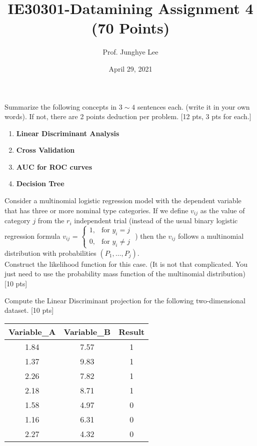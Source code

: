 \documentclass{homework}
\title{IE30301-Datamining Assignment 4 (70 Points)}
\author{Prof. Junghye Lee}
\date{April 29, 2021}
\begin{document}
    \maketitle
    \exercise*
    Summarize the following concepts in $3\sim4$ sentences each. (write it in your own words). If not, there are 2 points deduction per problem. [12 pts, 3 pts for each.]  \\
    \begin{enumerate}
        \item \textbf{Linear Discriminant Analysis}
        \item \textbf{Cross Validation}
        \item \textbf{AUC for ROC curves}
        \item \textbf{Decision Tree}
    \end{enumerate}
    \vspace{10mm}
    
    \exercise*
	Consider a multinomial logistic regression model with the dependent variable that has three or more nominal type categories. If we define $v_{ij}$ as the value of category $j$ from the $r_i$ independent trial 
	\Big(instead of the usual binary logistic regression formula  
	$v_{ij}$ =
	$\begin{cases}
    1, & \text{for } y_{i}=j\\
    0, & \text{for } y_{i} \neq j
    \end{cases}$
	\Big) then the $v_{ij}$  follows a multinomial distribution with probabilities $(P_1,…,P_j)$.\\
	Construct the likelihood function for this case. (It is not that complicated. You just need to use the probability mass function of the multinomial distribution)  [10 pts]
	\vspace{10mm}
	

    \newpage
    
    \exercise*
    Compute the Linear Discriminant projection for the following two-dimensional dataset. [10 pts]
    \begin{table}[!h]
    \begin{center}
    \begin{tabular}{|c|c|c|}
    \hline
    Variable\_A & Variable\_B & Result \\ \hline
    1.84        & 7.57        & 1      \\ \hline
    1.37        & 9.83        & 1      \\ \hline
    2.26        & 7.82        & 1      \\ \hline
    2.18        & 8.71        & 1      \\ \hline
    1.58        & 4.97        & 0      \\ \hline
    1.16        & 6.31        & 0      \\ \hline
    2.27        & 4.32        & 0      \\ \hline
    \end{tabular}
    \end{center}
    \end{table}
    
\end{document}
